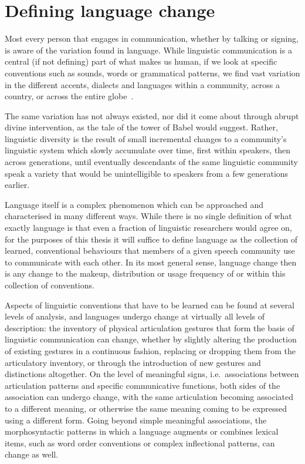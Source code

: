 \section{Defining language change}

Most every person that engages in communication, whether by talking or signing, is aware of the variation found in language. While linguistic communication is a central (if not defining) part of what makes us human, if we look at specific conventions such as sounds, words or grammatical patterns, we find vast variation in the different accents, dialects and languages within a community, across a country, or across the entire globe~\citep{Evans2009}.

The same variation has not always existed, nor did it come about through abrupt divine intervention, as the tale of the tower of Babel would suggest. Rather, linguistic diversity is the result of small incremental changes to a community's linguistic system which slowly accumulate over time, first within speakers, then across generations, until eventually descendants of the same linguistic community speak a variety that would be unintelligible to speakers from a few generations earlier.

Language itself is a complex phenomenon which can be approached and characterised in many different ways. While there is no single definition of what exactly language is that even a fraction of linguistic researchers would agree on, for the purposes of this thesis it will suffice to define language as the collection of learned, conventional behaviours %
that members of a given speech community use to communicate with each other. In its most general sense, language change then is any change to the makeup, distribution or usage frequency of or within this collection of conventions.

Aspects of linguistic conventions that have to be learned can be found at several levels of analysis, and languages undergo change at virtually all levels of description: the inventory of physical articulation gestures that form the basis of linguistic communication can change, whether by slightly altering the production of existing gestures in a continuous fashion, replacing or dropping them from the articulatory inventory, or through the introduction of new gestures and distinctions altogether. On the level of meaningful signs, i.e.~associations between articulation patterns and specific communicative functions, both sides of the association can undergo change, with the same articulation becoming associated to a different meaning, or otherwise the same meaning coming to be expressed using a different form. Going beyond simple meaningful associations, the morphosyntactic patterns in which a language augments or combines lexical items, such as word order conventions or complex inflectional patterns, can change as well.

